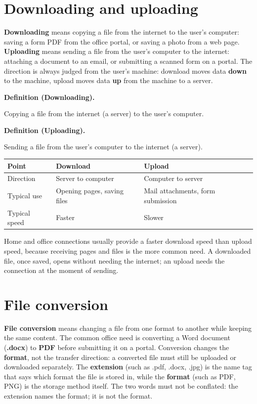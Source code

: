 \documentclass[11pt]{article}
\newenvironment{definitionbox}[1]{%
  \par\noindent\textbf{Definition (#1).}\ \itshape
}{\par\vspace{0.3em}}
\begin{document}
\section{Downloading and uploading}
\textbf{Downloading} means copying a file from the internet to the user's
computer: saving a form PDF from the office portal, or saving a photo from a
web page. \textbf{Uploading} means sending a file from the user's computer to
the internet: attaching a document to an email, or submitting a scanned form
on a portal. The direction is always judged from the user's machine: download
moves data \textbf{down} to the machine, upload moves data \textbf{up} from
the machine to a server.

\begin{definitionbox}{Downloading}
Copying a file from the internet (a server) to the user's computer.
\end{definitionbox}

\begin{definitionbox}{Uploading}
Sending a file from the user's computer to the internet (a server).
\end{definitionbox}

\begin{center}
\begin{tabular}{p{}p{}p{}}
\toprule
\textbf{Point} & \textbf{Download} & \textbf{Upload} \\
\midrule
Direction & Server to computer & Computer to server \\
Typical use & Opening pages, saving files & Mail attachments, form submission \\
Typical speed & Faster & Slower \\
\bottomrule
\end{tabular}
\end{center}

Home and office connections usually provide a faster download speed than
upload speed, because receiving pages and files is the more common need. A
downloaded file, once saved, opens without needing the internet; an upload
needs the connection at the moment of sending.

\section{File conversion}
\textbf{File conversion} means changing a file from one format to another
while keeping the same content. The common office need is converting a Word
document (\textbf{.docx}) to \textbf{PDF} before submitting it on a portal.
Conversion changes the \textbf{format}, not the transfer direction: a
converted file must still be uploaded or downloaded separately. The
\textbf{extension} (such as .pdf, .docx, .jpg) is the name tag that says
which format the file is stored in, while the \textbf{format} (such as PDF,
PNG) is the storage method itself. The two words must not be conflated: the
extension names the format; it is not the format.
\end{document}
